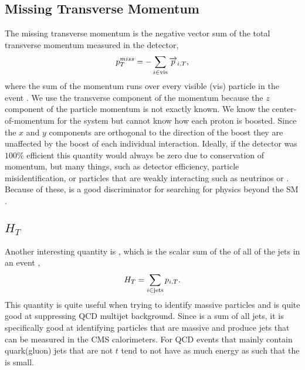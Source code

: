 \subsection{Missing Transverse Momentum}\label{MET}
The missing transverse momentum \cite{lester_measuring_1999, barr_variable_2003} is the negative vector sum of the total transverse momentum measured in the detector,
\begin{equation}
p_{T}^{miss}=-\sum_{i\in\text{vis}}\overrightarrow{p}_{i, T},
\end{equation}
where the sum of the momentum runs over every visible (vis) particle in the event \cite{collaboration_missing_2011}. We use the transverse component of the momentum because the $z$ component of the particle momentum is not exactly known. We know the center-of-momentum for the system but cannot know how each proton is boosted. Since the $x$ and $y$ components are orthogonal to the direction of the boost they are unaffected by the boost of each individual interaction. Ideally, if the detector was $100\%$ efficient this quantity would always be zero due to conservation of momentum, but many things, such as detector efficiency, particle misidentification, or particles that are weakly interacting such as neutrinos or \neutralino. Because of these, \met{} is a good discriminator for searching for physics beyond the SM \cite{noauthor_https://twiki.cern.ch/twiki/bin/view/cms/missingetrun2corrections_nodate}. 


\subsection{$H_T$}\label{HT}
Another interesting quantity is \Ht, which is the scalar sum of the \pt{} of all of the jets in an event \cite{cms_collaboration_search_2011},
\begin{equation}
H_{T}=\sum_{i\in\text{jets}}p_{i,T}.
\end{equation}
This quantity is quite useful when trying to identify massive particles and is quite good at suppressing QCD multijet background. Since \Ht{} is a sum of all jets, it is specifically good at identifying particles that are massive and produce jets that can be measured in the CMS calorimeters. For QCD events that mainly contain quark(gluon) jets that are not $t$ tend to not have as much energy as such that the \Ht{} is small. 

